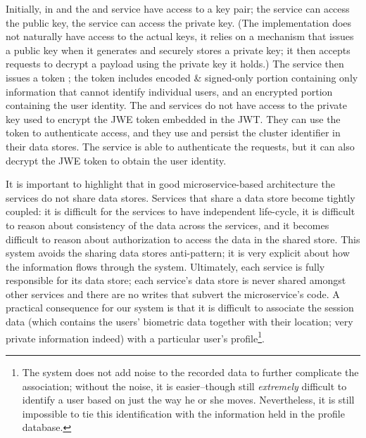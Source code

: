 Initially, in  and  the  and  service have access to a key pair; the  service can access the public key, the  service can access the private key. (The implementation does not naturally have access to the actual keys, it relies on a mechanism that issues a public key when it generates and securely stores a private key; it then accepts requests to decrypt a payload using the private key it holds.) The  service then issues a token ; the token includes encoded \& signed-only portion containing only information that cannot identify individual users, and an encrypted portion containing the user identity. The   and   services do not have access to the private key used to encrypt the JWE token embedded in the JWT. They can use the token to authenticate access, and they use and persist the cluster identifier in their data stores. The   service is able to authenticate the requests, but it can also decrypt the JWE token to obtain the user identity.

It is important to highlight that in good microservice-based architecture the services do not share data stores. Services that share a data store become tightly coupled: it is difficult for the services to have independent life-cycle, it is difficult to reason about consistency of the data across the services, and it becomes difficult to reason about authorization to access the data in the shared store.
This system avoids the sharing data stores anti-pattern; it is very explicit about how the information flows through the system. Ultimately, each service is fully responsible for its data store; each service's data store is never shared amongst other services and there are no writes that subvert the microservice's code.
A practical consequence for our system is that it is difficult to associate the session data (which contains the users' biometric data together with their location; very private information indeed) with a particular user's profile\footnote{The system does not add noise to the recorded data to further complicate the association; without the noise, it is easier--though still \emph{extremely} difficult to identify a user based on just the way he or she moves. Nevertheless, it is still impossible to tie this identification with the information held in the profile database.}. 

